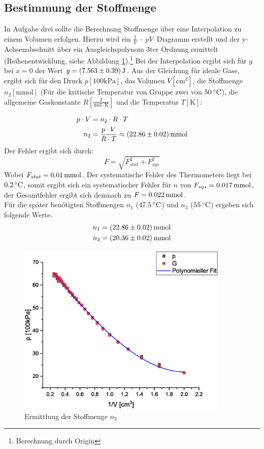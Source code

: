 \subsection{Bestimmung der Stoffmenge} \label{sec:Stoffmenge}
In Aufgabe drei sollte die Berechnung Stoffmenge über eine Interpolation zu einem Volumen erfolgen. Hierzu wird ein $\frac{1}{V}$ -- $pV$--Diagramm erstellt und der y-Achsenabschnitt über ein Ausgleichspolynom 3ter Ordnung ermittelt (Reihenentwicklung, siehe Abbildung \ref{fig:aufgabe3}).\footnote{Berechnung durch Origin} Bei der Interpolation ergibt sich für $y$ bei $x=0$ der Wert $y=\unit[(7.563 \pm 0.39)]{J}  $. Aus der Gleichung für ideale Gase, ergibt sich für den Druck $p [\mathrm{100kPa}]$, das Volumen $V [\mathrm{cm^3}]$, die Stoffmenge $n_2 [\mathrm{mmol}]$ (Für die kritische Temperatur von Gruppe zwei von $\unit[50]{^\circ C}$), die allgemeine Gaskonstante $R [\mathrm{\frac{J}{mol \cdot K}}]$ und die Temperatur $T [\mathrm{K}]$:

\begin{align}
p \cdot V &= n_2 \cdot R \cdot T\\
n_2 &= \frac{p \cdot V}{R \cdot T} \approx \unit[(22.86 \pm 0.02)]{mmol} \notag
\end{align}
Der Fehler ergibt sich durch:
\[
F = \sqrt{F_{stat}^2 + F_{sys}^2}
\]
Wobei $F_{stat} = \unit[0.01]{mmol}$. Der systematische Fehler des Thermometers liegt bei $\unit[0.2]{^\circ C}$, somit ergibt sich ein systematischer Fehler für $n$ von $F_{sys} = \unit[0.017]{mmol}$, der Gesamtfehler ergibt sich demnach zu $F = \unit[0.022]{mmol}$. \\
Für die später benötigten Stoffmengen $n_1$ ($\unit[47.5]{^\circ C}$) und $n_3$ ($\unit[55]{^\circ C}$) ergeben sich folgende Werte.
\begin{align*}
n_1 &= \unit[(22.86 \pm 0.02)]{mmol}\\
n_3 &= \unit[(20.36 \pm 0.02)]{mmol}
\end{align*}

\begin{figure}
\includegraphics[width=0.9\textwidth]{Bilder/aufgabe_3.eps}
\caption{Ermittlung der Stoffmenge $n_2$}
\label{fig:aufgabe3}
\end{figure}